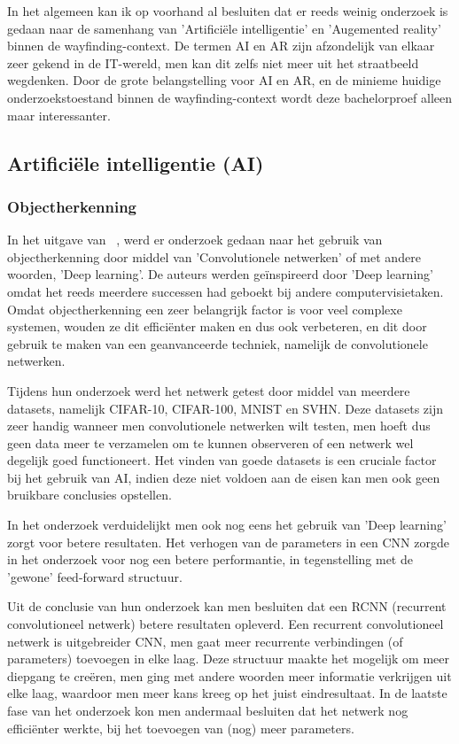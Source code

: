In het algemeen kan ik op voorhand al besluiten dat er reeds weinig onderzoek is gedaan naar de samenhang van 'Artificiële intelligentie' en 'Augemented reality' binnen de wayfinding-context. De termen AI en AR zijn afzondelijk van elkaar zeer gekend in de IT-wereld, men kan dit zelfs niet meer uit het straatbeeld wegdenken. Door de grote belangstelling voor AI en AR, en de minieme huidige onderzoekstoestand binnen de wayfinding-context wordt deze bachelorproef alleen maar interessanter.

\subsection{Artificiële intelligentie (AI)}

\subsubsection{Objectherkenning}
In het uitgave van ~\autocite{Liang2015}, \textcite{Liang2015} werd er onderzoek gedaan naar het gebruik van objectherkenning door middel van 'Convolutionele netwerken' of met andere woorden, 'Deep learning'. De auteurs werden geïnspireerd door 'Deep learning' omdat het reeds meerdere successen had geboekt bij andere computervisietaken. Omdat objectherkenning een zeer belangrijk factor is voor veel complexe systemen, wouden ze dit efficiënter maken en dus ook verbeteren, en dit door gebruik te maken van een geanvanceerde techniek, namelijk de convolutionele netwerken. 

Tijdens hun onderzoek werd het netwerk getest door middel van meerdere datasets, namelijk CIFAR-10, CIFAR-100, MNIST en SVHN. Deze datasets zijn zeer handig wanneer men convolutionele netwerken wilt testen, men hoeft dus geen data meer te verzamelen om te kunnen observeren of een netwerk wel degelijk goed functioneert. Het vinden van goede datasets is een cruciale factor bij het gebruik van AI, indien deze niet voldoen aan de eisen kan men ook geen bruikbare conclusies opstellen.

In het onderzoek verduidelijkt men ook nog eens het gebruik van 'Deep learning' zorgt voor betere resultaten. Het verhogen van de parameters in een CNN zorgde in het onderzoek voor nog een betere performantie, in tegenstelling met de 'gewone' feed-forward structuur. 

Uit de conclusie van hun onderzoek kan men besluiten dat een RCNN (recurrent convolutioneel netwerk) betere resultaten opleverd. Een recurrent convolutioneel netwerk is uitgebreider CNN, men gaat meer recurrente verbindingen (of parameters) toevoegen in elke laag. Deze structuur maakte het mogelijk om meer diepgang te creëren, men ging met andere woorden meer informatie verkrijgen uit elke laag, waardoor men meer kans kreeg op het juist eindresultaat. In de laatste fase van het onderzoek kon men andermaal besluiten dat het netwerk nog efficiënter werkte, bij het toevoegen van (nog) meer parameters.


